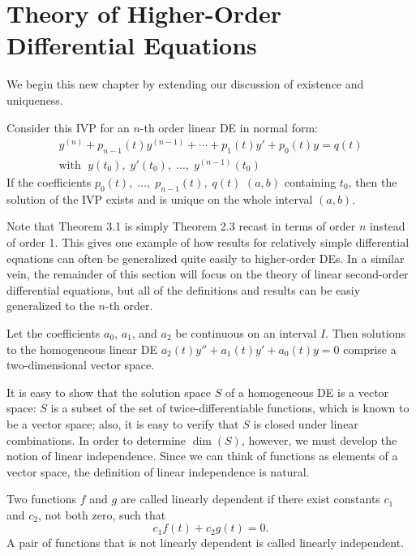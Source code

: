 \documentclass[../m82main.tex]{subfiles}
\begin{document}
\section{Theory of Higher-Order Differential Equations}
We begin this new chapter by extending our discussion of existence and uniqueness.

\begin{theorem}
    Consider this IVP for an $n$-th order linear DE in normal form:
    \begin{gather*}
        y^{(n)} + p_{n-1}(t)y^{(n-1)} + \cdots + p_1(t)y' + p_0(t)y = q(t) \\
        \text{with }\; y(t_0),\; y'(t_0),\; \ldots,\; y^{(n-1)}(t_0)
    \end{gather*}
    If the coefficients $p_0(t),\; \ldots,\; p_{n-1}(t),\; q(t)$  $(a, b)$ containing $t_0$, then the solution of the IVP exists and is unique on the whole interval $(a, b)$.
\end{theorem}

Note that Theorem 3.1 is simply Theorem 2.3 recast in terms of order $n$ instead of order 1.
This gives one example of how results for relatively simple differential equations can often be generalized quite easily to higher-order DEs.
In a similar vein, the remainder of this section will focus on the theory of linear second-order differential equations, but all of the definitions and results can be easiy generalized to the $n$-th order.

\begin{theorem}
    Let the coefficients $a_0$, $a_1$, and $a_2$ be continuous on an interval $I$.
    Then solutions to the homogeneous linear DE $a_2(t)y'' + a_1(t)y' + a_0(t)y = 0$ comprise a two-dimensional vector space.
\end{theorem}

It is easy to show that the solution space $S$ of a homogeneous DE is a vector space: $S$ is a subset of the set of twice-differentiable functions, which is known to be a vector space; also, it is easy to verify that $S$ is closed under linear combinations.
In order to determine $\dim (S)$, however, we must develop the notion of linear independence.
Since we can think of functions as elements of a vector space, the definition of linear independence is natural.

\begin{definition}
    Two functions $f$ and $g$ are called linearly dependent if there exist constants $c_1$ and $c_2$, not both zero, such that
    \[ c_1f(t) + c_2g(t) = 0. \]
    A pair of functions that is not linearly dependent is called linearly independent.
\end{definition}
\end{document}
